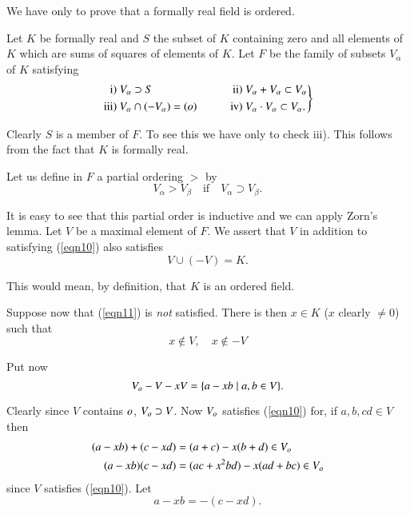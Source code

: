 \begin{Proof}
We have only to prove that a formally real field is ordered.

Let $K$ be formally real and $S$ the subset of $K$ containing zero and
all elements of $K$ which are sums of squares of elements of $K$. Let
$F$ be the family of subsets $V_\alpha$ of $K$ satisfying
\begin{equation}\label{eqn10}
\left.
\begin{aligned}
\mbox{i) } V_\alpha &\supset S &\qquad  \mbox{ii) } V_\alpha& +
V_\alpha \subset V_\alpha\\
\mbox{iii) } V_\alpha & \cap (-V_\alpha) = (o) &\qquad  \mbox{iv) }
V_\alpha&\cdot V_\alpha \subset V_\alpha.
\end{aligned}
\right\}
\end{equation}

Clearly $S$ is a member of $F$. To see this we have only to check
iii). This follows from the fact that $K$ is formally real.

Let us define in $F$ a partial ordering $>$ by
$$
V_\alpha > V_\beta\quad \text{if}\quad V_\alpha \supset V_\beta.
$$

It is easy to see that this partial order is inductive and we can
apply Zorn's lemma. Let $V$ be a maximal element of $F$. We assert
that $V$ in addition to satisfying (\ref{eqn10}) also satisfies
\begin{equation}\label{eqn11}
V\cup (-V)=K.
\end{equation}

This would mean, by definition, that $K$ is an ordered field.

Suppose now that (\ref{eqn11}) is \textit{not} satisfied. There is
then $x\in K$ ($x$ clearly $\neq 0$) such that
\begin{equation}\label{eqn12}
x\not\in V,\quad x\not\in-V
\end{equation}

Put now 
\begin{equation*}
V_{o}-V-xV=\{a-xb \mid a, b \in V\}.
\end{equation*}

Clearly since $V$ contains $o$, $V_{o}\supset V$. Now $V_{o}$
satisfies (\ref{eqn10}) for, if $a, b, c d\in V$ then
\begin{align*}
(a-xb)+ (c-xd)&= (a+c) - x(b+d)\in V_{o}\\
(a-xb)(c-xd)&= (ac+ x^{2}bd)-x(ad+bc)\in V_{o}
\end{align*}
since $V$ satisfies (\ref{eqn10}). Let
$$
a-xb= -(c-xd).
$$


\end{Proof}

